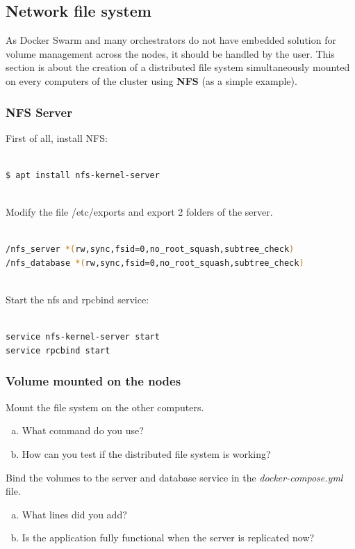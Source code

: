 \documentclass[a4paper,11pt]{exam}
\begin{document}
\clearpage

\subsection{Network file system}

As Docker Swarm and many orchestrators do not have embedded solution for volume management across the nodes, it should be handled by the user.
This section is about the creation of a distributed file system simultaneously mounted on every computers of the cluster using \textbf{NFS} (as a simple example).

\subsubsection{NFS Server}

First of all, install NFS:

\begin{lstlisting}[frame=single,language={sh}]  % Start your code-block

$ apt install nfs-kernel-server
			
\end{lstlisting}

Modify the file /etc/exports and export 2 folders of the server.

\begin{lstlisting}[frame=single,language={sh}]  % Start your code-block

/nfs_server *(rw,sync,fsid=0,no_root_squash,subtree_check)
/nfs_database *(rw,sync,fsid=0,no_root_squash,subtree_check)	
			
\end{lstlisting}

Start the nfs and rpcbind service: 

\begin{lstlisting}[frame=single,language={sh}]  % Start your code-block

service nfs-kernel-server start	
service rpcbind start			

\end{lstlisting}

\subsubsection{Volume mounted on the nodes}

\begin{questions}
	\question Mount the file system on the other computers.
	\begin{enumerate}[(a)]
		\item What command do you use?
		\item How can you test if the distributed file system is working?
	\end{enumerate}
	\question Bind the volumes to the server and database service in the \textit{docker-compose.yml} file.
	\begin{enumerate}[(a)]
		\item What lines did you add?
		\item Is the application fully functional when the server is replicated now?
	\end{enumerate}
\end{questions}
\end{document}
